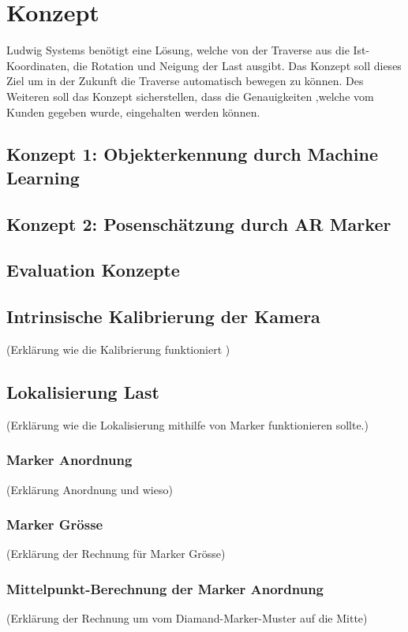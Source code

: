 \section{Konzept}

Ludwig Systems benötigt eine Lösung, welche von der Traverse aus die Ist-Koordinaten, die Rotation und Neigung der Last ausgibt. Das Konzept soll dieses Ziel um in der Zukunft die Traverse automatisch bewegen zu können. Des Weiteren soll das Konzept sicherstellen, dass die Genauigkeiten ,welche vom Kunden gegeben wurde, eingehalten werden können.

\subsection{Konzept 1: Objekterkennung durch Machine Learning}

\subsection{Konzept 2:  Posenschätzung durch AR Marker}

\subsection{Evaluation Konzepte}

\subsection{Intrinsische Kalibrierung der Kamera}
(Erklärung wie die Kalibrierung funktioniert )

\subsection{Lokalisierung Last}
(Erklärung wie die Lokalisierung mithilfe von Marker funktionieren sollte.)
\subsubsection{Marker Anordnung}
(Erklärung Anordnung und wieso)
\subsubsection{Marker Grösse}
(Erklärung der Rechnung für Marker Grösse)
\subsubsection{Mittelpunkt-Berechnung der Marker Anordnung}
(Erklärung der Rechnung um vom Diamand-Marker-Muster auf die Mitte) 

